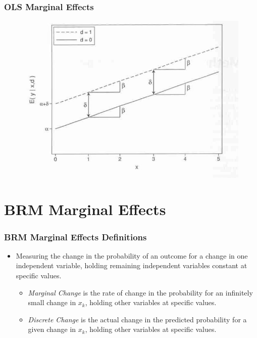 \documentclass{beamer}
\begin{document}
\begin{frame}
	\frametitle{OLS Marginal Effects}
		\begin{figure}[p]
			\centering
			\includegraphics[scale=0.45]{images/ols_marginal_effects.png}
			\label{fig:fig1}
		\end{figure}
\end{frame}

\section{BRM Marginal Effects}

\begin{frame}
	\frametitle{BRM Marginal Effects Definitions}
		\begin{itemize}
			\item Measuring the change in the probability of an outcome for a change in one independent variable, holding remaining independent variables constant at specific values.
				\begin{itemize}
					\item \textit{Marginal Change} is the rate of change in the probability for an infinitely small change in $x_{k}$, holding other variables at specific values.
					\item \textit{Discrete Change} is the actual change in the predicted probability for a given change in $x_{k}$, holding other variables at specific values.
				\end{itemize}
		\end{itemize}
\end{frame}
\end{document}
